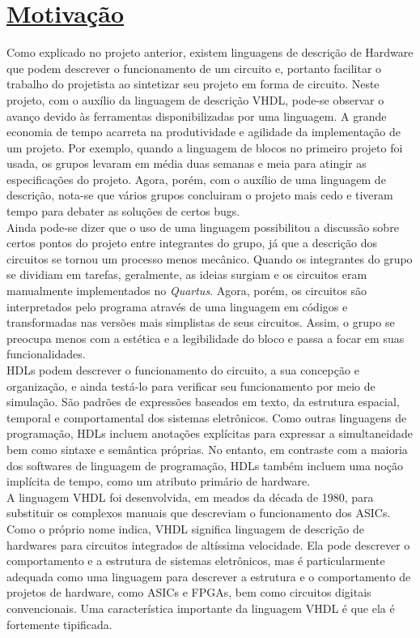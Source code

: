 \documentclass[14pt, oneside]{book}
\newcommand\tab[1][1cm]{\hspace*{#1}}
\theoremstyle{definition}
\begin{document}
        \chapter[Motivação]{\hyperlink{toc}{Motivação}}
            \tab Como explicado no projeto anterior, existem linguagens de descrição de Hardware que podem descrever o funcionamento de um circuito e, portanto facilitar o trabalho do projetista ao sintetizar seu projeto em forma de circuito. Neste projeto, com o auxílio da linguagem de descrição VHDL, pode-se observar o avanço devido às ferramentas disponibilizadas por uma linguagem. A grande economia de tempo acarreta na produtividade e agilidade da implementação de um projeto. Por exemplo, quando a linguagem de blocos no primeiro projeto foi usada, os grupos levaram em média duas semanas e meia para atingir as especificações do projeto. Agora, porém, com o auxílio de uma linguagem de descrição, nota-se que vários grupos concluiram o projeto mais cedo e tiveram tempo para debater as soluções de certos bugs. \\
	        \tab Ainda pode-se dizer que o uso de uma linguagem possibilitou a discussão sobre certos pontos do projeto entre integrantes do grupo, já que a descrição dos circuitos se tornou um processo menos mecânico. Quando os integrantes do grupo se dividiam em tarefas, geralmente, as ideias surgiam e os circuitos eram manualmente implementados no \textit{Quartus}. Agora, porém, os circuitos são interpretados pelo programa através de uma linguagem em códigos e transformadas nas versões mais simplistas de seus circuitos. Assim, o grupo se preocupa menos com a estética e a legibilidade do bloco e passa a focar em suas funcionalidades.\\
	        \tab HDLs podem descrever o funcionamento do circuito, a sua concepção e organização, e ainda testá-lo para verificar seu funcionamento por meio de simulação. São padrões de expressões baseados em texto, da estrutura espacial, temporal e comportamental dos sistemas eletrônicos. Como outras linguagens de programação, HDLs incluem anotações explícitas para expressar a simultaneidade bem como sintaxe e semântica próprias. No entanto, em contraste com a maioria dos softwares de linguagem de programação, HDLs também incluem uma noção implícita de tempo, como um atributo primário de hardware. \\
	        \tab A linguagem VHDL foi desenvolvida, em meados da década de 1980, para substituir os complexos manuais que descreviam o funcionamento dos 	ASICs. Como o próprio nome indica, VHDL significa linguagem de descrição de hardwares para circuitos integrados de altíssima velocidade. Ela pode descrever o comportamento e a estrutura de sistemas eletrônicos, mas é particularmente adequada como uma linguagem para descrever a estrutura e o 		comportamento de projetos de hardware, como ASICs e FPGAs, bem como circuitos digitais convencionais. Uma característica importante da linguagem VHDL é que ela é fortemente tipificada. \\
\end{document}
